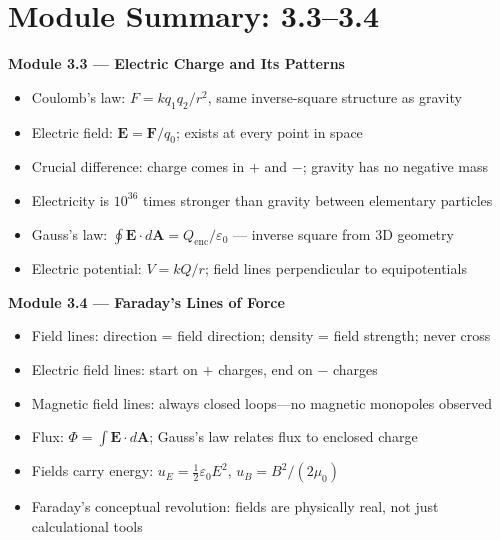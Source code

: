 \documentclass[12pt, a4paper, twoside]{book}
\theoremstyle{disc}
\begin{document}
\chapter*{Module Summary: 3.3--3.4}

\begin{tcolorbox}[enhanced,colback=deep!4,colframe=deep,
  title={\bfseries\color{white} Key Ideas: Modules 3.3--3.4},
  attach boxed title to top left={yshift=-2mm,xshift=4mm},
  boxed title style={colback=deep}]

\textbf{Module 3.3 --- Electric Charge and Its Patterns}
\begin{itemize}[leftmargin=1.5em,itemsep=2pt]
  \item Coulomb's law: $F = kq_1q_2/r^2$, same inverse-square structure as gravity
  \item Electric field: $\bm{E} = \bm{F}/q_0$; exists at every point in space
  \item Crucial difference: charge comes in $+$ and $-$; gravity has no negative mass
  \item Electricity is $10^{36}$ times stronger than gravity between elementary particles
  \item Gauss's law: $\oint \bm{E}\cdot d\bm{A} = Q_{\text{enc}}/\varepsilon_0$ --- inverse square from 3D geometry
  \item Electric potential: $V = kQ/r$; field lines perpendicular to equipotentials
\end{itemize}

\vspace{6pt}
\textbf{Module 3.4 --- Faraday's Lines of Force}
\begin{itemize}[leftmargin=1.5em,itemsep=2pt]
  \item Field lines: direction = field direction; density = field strength; never cross
  \item Electric field lines: start on $+$ charges, end on $-$ charges
  \item Magnetic field lines: always closed loops---no magnetic monopoles observed
  \item Flux: $\Phi = \int \bm{E}\cdot d\bm{A}$; Gauss's law relates flux to enclosed charge
  \item Fields carry energy: $u_E = \frac{1}{2}\varepsilon_0 E^2$, $u_B = B^2/(2\mu_0)$
  \item Faraday's conceptual revolution: fields are physically real, not just calculational tools
\end{itemize}
\end{tcolorbox}
\end{document}
